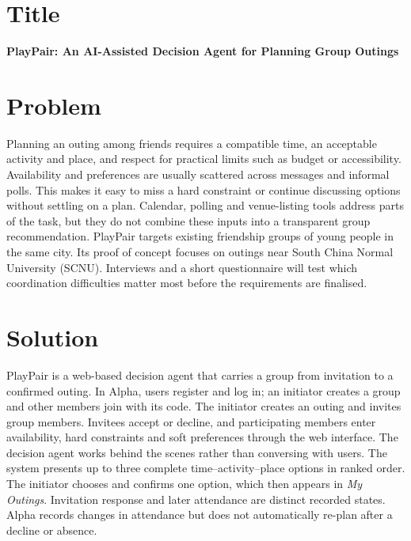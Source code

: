 \documentclass[12pt,a4paper]{article}
\begin{document}
\section*{Title}
\textbf{PlayPair: An AI-Assisted Decision Agent for Planning Group Outings}

\section*{Problem}
Planning an outing among friends requires a compatible time, an acceptable activity and place, and respect for practical limits such as budget or accessibility. Availability and preferences are usually scattered across messages and informal polls. This makes it easy to miss a hard constraint or continue discussing options without settling on a plan. Calendar, polling and venue-listing tools address parts of the task, but they do not combine these inputs into a transparent group recommendation. PlayPair targets existing friendship groups of young people in the same city. Its proof of concept focuses on outings near South China Normal University (SCNU). Interviews and a short questionnaire will test which coordination difficulties matter most before the requirements are finalised.

\section*{Solution}
PlayPair is a web-based decision agent that carries a group from invitation to a confirmed outing. In Alpha, users register and log in; an initiator creates a group and other members join with its code. The initiator creates an outing and invites group members. Invitees accept or decline, and participating members enter availability, hard constraints and soft preferences through the web interface. The decision agent works behind the scenes rather than conversing with users. The system presents up to three complete time--activity--place options in ranked order. The initiator chooses and confirms one option, which then appears in \emph{My Outings}. Invitation response and later attendance are distinct recorded states. Alpha records changes in attendance but does not automatically re-plan after a decline or absence.
\end{document}
